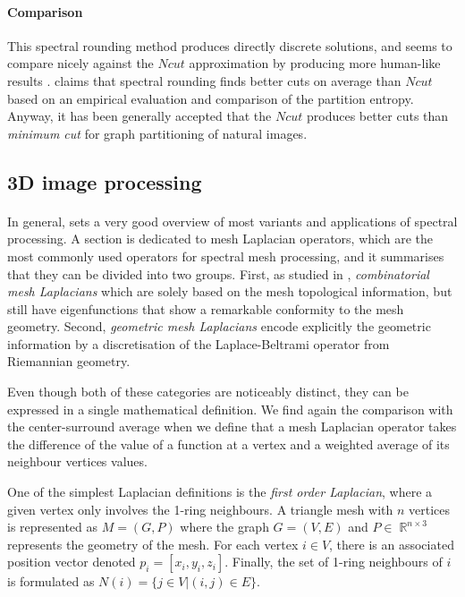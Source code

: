 \documentclass[]{article}
\DeclareMathOperator{\Real}{\mathbb{R}}
\begin{document}
\paragraph{Comparison}
This spectral rounding method produces directly discrete solutions, and seems to compare nicely against the \(Ncut\) approximation by producing more human-like results \cite{tolliver_spectral_2006}.
\cite{tolliver_graph_2006} claims that spectral rounding finds better cuts on average than \(Ncut\) based on an empirical evaluation and comparison of the partition entropy.
Anyway, it has been generally accepted that the \(Ncut\) produces better cuts than \textit{minimum cut} for graph partitioning of natural images.

\subsection{3D image processing}

\paragraph{}
In general, \cite{zhang_spectral_2010} sets a very good overview of most variants and applications of spectral processing.
A section is dedicated to mesh Laplacian operators, which are the most commonly used operators for spectral mesh processing, and it summarises that they can be divided into two groups.
First, as studied in \cite{chung_spectral_1997}, \textit{combinatorial mesh Laplacians} which are solely based on the mesh topological information, but still have eigenfunctions that show a remarkable conformity to the mesh geometry.
Second, \textit{geometric mesh Laplacians} encode explicitly the geometric information by a discretisation of the Laplace-Beltrami operator from Riemannian geometry.

Even though both of these categories are noticeably distinct, they can be expressed in a single mathematical definition.
We find again the comparison with the center-surround average when we define that a mesh Laplacian operator takes the difference of the value of a function at a vertex and a weighted average of its neighbour vertices values.

One of the simplest Laplacian definitions is the \textit{first order Laplacian}, where a given vertex only involves the 1-ring neighbours.
A triangle mesh with \(n\) vertices is represented as \(M = (G, P)\) where the graph \(G = (V, E)\) and \(P \in \Real^{n\times 3}\) represents the geometry of the mesh.
For each vertex \(i \in V\), there is an associated position vector denoted \(p_i = [x_i, y_i, z_i]\).
Finally, the set of 1-ring neighbours of \(i\) is formulated as \(N(i) = \{j \in V | (i, j) \in E\}\).
\end{document}
